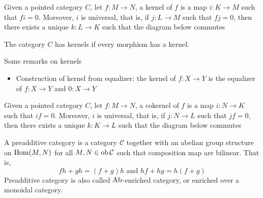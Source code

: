 \documentclass{report}
\begin{document}
\begin{definition}[kernel]
    Given a pointed category $C$, let $f: M \to N$, a kernel of $f$ is a map $i: K \to M$ such that $fi = 0$. Moreover, $i$ is universal, that is, if $j: L \to M$ such that $fj = 0$, then there exists a unique $k: L \to K$ such that the diagram below commutes
    \begin{center}
    \end{center}
    The category $C$ has kernels if every morphism has a kernel.
\end{definition}

\begin{remark}
    Some remarks on kernels
    \begin{itemize}
        \item Construction of kernel from equalizer: the kernel of $f: X \to Y$ is the equalizer of $f: X \to Y$ and $0: X \to Y$
    \end{itemize}
\end{remark}

\begin{definition}[cokernel]
    Given a pointed category $C$, let $f: M \to N$, a cokernel of $f$ is a map $i: N \to K$ such that $if = 0$. Moreover, $i$ is universal, that is, if $j: N \to L$ such that $jf = 0$, then there exists a unique $k: K \to L$ such that the diagram below commutes
    \begin{center}
    \end{center}
\end{definition}

\begin{definition}
    A preadditive category is a category $\mathcal{C}$ together with an abelian group structure on $\operatorname{Hom}(M, N)$ for all $M, N \in \operatorname{ob} \mathcal{C}$ such that composition map are bilinear. That is,
    $$
        fh + gh = (f+g) h \text{ and } hf + hg = h (f+g)
    $$
    Preadditive category is also called $\operatorname{Ab}$-enriched category, or enriched over a monoidal category.
\end{definition}
\end{document}
